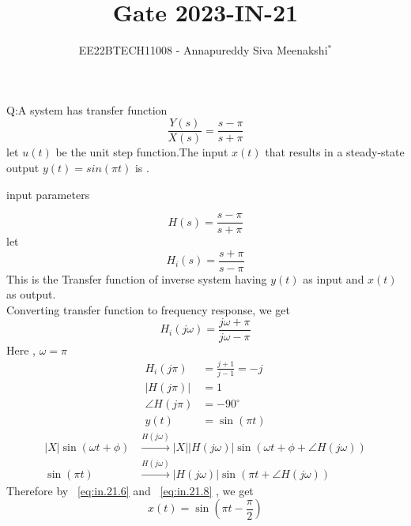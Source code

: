 \documentclass[journal,12pt,twocolumn]{IEEEtran}
\newcommand{\system}[1]{\stackrel{#1}{\rightarrow}}
\theoremstyle{remark}
\begin{document}

\vspace{3cm}

\title{Gate 2023-IN-21}
\author{EE22BTECH11008 - Annapureddy Siva Meenakshi$^{*}$%
}
\maketitle
\bigskip

\renewcommand{\thefigure}{\theenumi}
\renewcommand{\thetable}{\theenumi}
Q:A system has transfer function
 \[\frac{Y(s)}{X(s)}=\frac {s-\pi}{s+\pi}\]
 let $u(t)$ be the unit step function.The input $x(t)$ that results in a steady-state output $y(t)=sin(\pi t)$ is \underline{\quad}.
\solution
\begin{table}[!ht]
    \centering
        
    \caption{input parameters}
    \label{tab:in_21_t1}
\end{table}
 \begin{equation}
     H(s)=\frac{s-\pi}{s+\pi}
 \end{equation} 
 let 
 \begin{equation}
     H_i(s)=\frac{s+\pi}{s-\pi}
 \end{equation} 
 This is the Transfer function of inverse system having $y(t)$ as input and $x(t)$ as output.\\
 Converting transfer function to frequency response, we get
 \begin{equation}
     H_i(j\omega)=\frac{j\omega+\pi}{j\omega-\pi}
 \end{equation}
 Here , $\omega=\pi$
 \begin{align}
    H_i(j\pi)&=\frac{j+1}{j-1}=-j\\
     |H(j\pi)|&=1\\
    \angle H(j\pi)&=-90^\circ\\
    y(t)&=\sin(\pi t)\label{eq:in.21.6} 
\end{align}
\begin{align}
  |X|\sin(\omega t+\phi)&\system{H(j\omega)}|X||H(j\omega)|\sin(\omega t +\phi +\angle H(j\omega))\label{eq:in.21.7}\\
  \sin(\pi t)&\system{H(j\omega)}|H(j\omega)|\sin\left(\pi t  +\angle H(j\omega)\right)\label{eq:in.21.8}
\end{align}
Therefore by ~\eqref{eq:in.21.6} and ~\eqref{eq:in.21.8} , we get
\begin{equation}
    x(t)=\sin\left(\pi t -\frac{\pi}{2}\right)
\end{equation}
\end{document}
